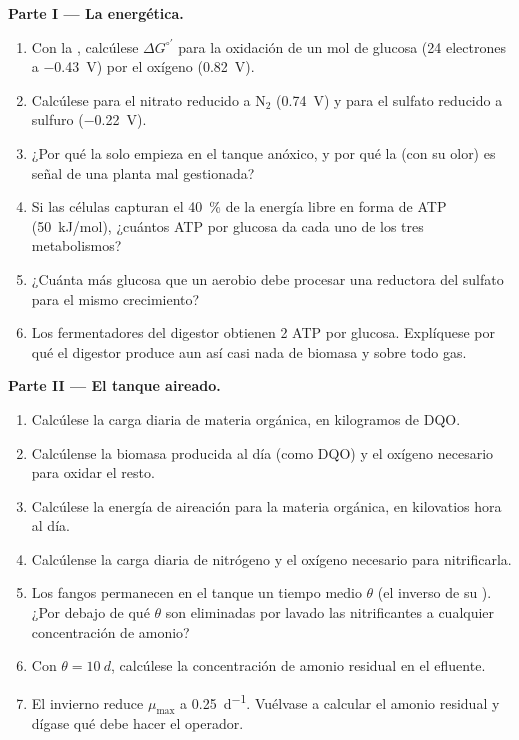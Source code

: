 \begin{problem}
\medskip
\noindent\textbf{Parte I --- La energética.}
\begin{enumerate}
  \item Con la , calcúlese $\Delta G^{\circ\prime}$
        para la oxidación de un mol de glucosa (24 electrones a
        \qty{-0.43}{V}) por el oxígeno (\qty{+0.82}{V}).
  \item Calcúlese para el nitrato reducido a $\mathrm{N_2}$
        (\qty{+0.74}{V}) y para el sulfato reducido a sulfuro
        (\qty{-0.22}{V}).
  \item ¿Por qué la  solo empieza en el tanque anóxico, y
        por qué la  (con su olor) es señal de una
        planta mal gestionada?
  \item Si las células capturan el \qty{40}{\%} de la energía libre en
        forma de ATP (\qty{50}{kJ/mol}), ¿cuántos ATP por glucosa da cada
        uno de los tres metabolismos?
  \item ¿Cuánta más glucosa que un aerobio debe procesar una reductora
        del sulfato para el mismo crecimiento?
  \item Los fermentadores del digestor obtienen 2 ATP por glucosa.
        Explíquese por qué el digestor produce aun así casi nada de
        biomasa y sobre todo gas.
\end{enumerate}

\medskip
\noindent\textbf{Parte II --- El tanque aireado.}
\begin{enumerate}[resume]
  \item Calcúlese la carga diaria de materia orgánica, en kilogramos de
        DQO.
  \item Calcúlense la biomasa producida al día (como DQO) y el oxígeno
        necesario para oxidar el resto.
  \item Calcúlese la energía de aireación para la materia orgánica, en
        kilovatios hora al día.
  \item Calcúlense la carga diaria de nitrógeno y el oxígeno necesario
        para nitrificarla.
  \item Los fangos permanecen en el tanque un tiempo medio $\theta$ (el
        inverso de su ). ¿Por debajo de qué $\theta$ son
        eliminadas por lavado las nitrificantes a cualquier concentración
        de amonio?
  \item Con $\theta = \qty{10}{d}$, calcúlese la concentración de amonio
        residual en el efluente.
  \item El invierno reduce $\mu_{\max}$ a \qty{0.25}{d^{-1}}. Vuélvase a
        calcular el amonio residual y dígase qué debe hacer el operador.
\end{enumerate}


\end{problem}
